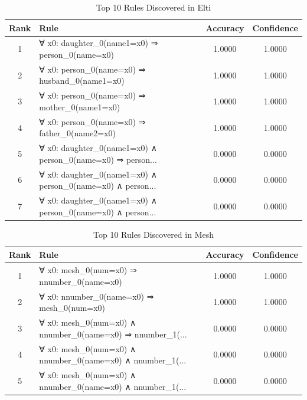 \documentclass[11pt,a4paper]{article}
\begin{document}
\begin{table}[h!]
\centering
\small
\caption{Top 10 Rules Discovered in Elti}
\label{tab:rules_Elti}
\begin{tabular}{|c|p{5cm}|c|c|}
\hline
\textbf{Rank} & \textbf{Rule} & \textbf{Accuracy} & \textbf{Confidence} \\
\hline
1 & ∀ x0: daughter\_0(name1=x0) ⇒ person\_0(name=x0) & 1.0000 & 1.0000 \\
2 & ∀ x0: person\_0(name=x0) ⇒ husband\_0(name1=x0) & 1.0000 & 1.0000 \\
3 & ∀ x0: person\_0(name=x0) ⇒ mother\_0(name1=x0) & 1.0000 & 1.0000 \\
4 & ∀ x0: person\_0(name=x0) ⇒ father\_0(name2=x0) & 1.0000 & 1.0000 \\
5 & ∀ x0: daughter\_0(name1=x0) ∧ person\_0(name=x0) ⇒ person... & 0.0000 & 0.0000 \\
6 & ∀ x0: daughter\_0(name1=x0) ∧ person\_0(name=x0) ∧ person... & 0.0000 & 0.0000 \\
7 & ∀ x0: daughter\_0(name1=x0) ∧ person\_0(name=x0) ∧ person... & 0.0000 & 0.0000 \\
\hline
\end{tabular}
\end{table}

\begin{table}[h!]
\centering
\small
\caption{Top 10 Rules Discovered in Mesh}
\label{tab:rules_Mesh}
\begin{tabular}{|c|p{5cm}|c|c|}
\hline
\textbf{Rank} & \textbf{Rule} & \textbf{Accuracy} & \textbf{Confidence} \\
\hline
1 & ∀ x0: mesh\_0(num=x0) ⇒ nnumber\_0(name=x0) & 1.0000 & 1.0000 \\
2 & ∀ x0: nnumber\_0(name=x0) ⇒ mesh\_0(num=x0) & 1.0000 & 1.0000 \\
3 & ∀ x0: mesh\_0(num=x0) ∧ nnumber\_0(name=x0) ⇒ nnumber\_1(... & 0.0000 & 0.0000 \\
4 & ∀ x0: mesh\_0(num=x0) ∧ nnumber\_0(name=x0) ∧ nnumber\_1(... & 0.0000 & 0.0000 \\
5 & ∀ x0: mesh\_0(num=x0) ∧ nnumber\_0(name=x0) ∧ nnumber\_1(... & 0.0000 & 0.0000 \\
\hline
\end{tabular}
\end{table}
\end{document}
